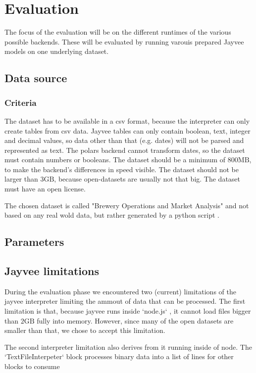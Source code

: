 \chapter{Evaluation}
\label{chapter:Evaluation}

The focus of the evaluation will be on the different runtimes of the various possible backends. These will be evaluated by running varouis prepared Jayvee models on one underlying dataset.

\section{Data source}
\label{section:data_source}

\subsection{Criteria}
\label{subsection:data_source_criteria}
The dataset has to be available in a csv format, because the interpreter can only create tables from csv data.
Jayvee tables can only contain boolean, text, integer and decimal values, so data other than that (e.g. dates) will not be parsed and represented as text.
The polars backend cannot transform dates, so the dataset must contain numbers or booleans.
The dataset should be a minimum of $800\text{MB}$, to make the backend's differences in speed visible.
The dataset should not be larger than $3\text{GB}$, because open-datasets are usually not that big. %
The dataset must have an open license.%

The chosen dataset is called "Brewery Operations and Market Analysis" and not based on any real wold data, but rather generated by a python script \autocite{dataset}.




\section{Parameters}
\label{section:parameters}

\section{Jayvee limitations}
\label{section:jv_limits}

During the evaluation phase we encountered two (current) limitations of the jayvee interpreter limiting %
the ammout of data that can be processed. The first limitation %
is that, because jayvee runs inside `node.js` %
, it cannot load files bigger than $2\text{GB}$ fully into memory.
However, since many of the open datasets are smaller than that, %
we chose to accept this limitation.

The second interpreter limitation also derives from it running inside of node.
The `TextFileInterpeter` %
block processes binary data into a list of lines for other blocks to consume
